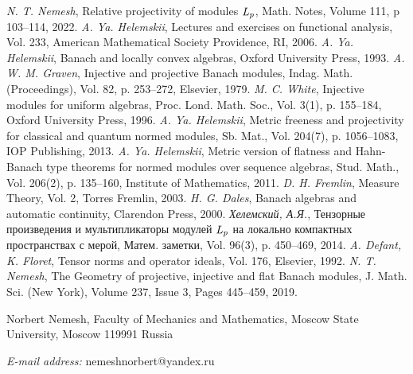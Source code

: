 \documentclass[12pt]{article}
\begin{document}
\begin{thebibliography}{999}
    \textit{N. T. Nemesh}, Relative projectivity of 
    modules $\it{L_p}$, Math. Notes, Volume 111, p 103--114, 2022.
    \textit{A. Ya. Helemskii}, Lectures and 
    exercises on functional analysis, Vol. 233, 
    American Mathematical Society Providence, RI, 2006.
    \textit{A. Ya. Helemskii}, Banach and locally 
    convex algebras, Oxford University Press, 1993.
    \textit{A. W. M. Graven}, Injective and 
    projective Banach modules, Indag. Math. (Proceedings), Vol. 82, p. 253--272,
    Elsevier, 1979.
    \textit{M. C. White}, Injective modules for uniform 
    algebras, Proc. Lond. Math. Soc., Vol. 3(1), p. 155--184, Oxford University 
    Press, 1996.
    \textit{A. Ya. Helemskii}, Metric freeness and 
    projectivity for classical and quantum normed modules, Sb. Mat., 
    Vol. 204(7), p. 1056--1083, IOP Publishing, 2013.
    \textit{A. Ya. Helemskii}, Metric version of 
    flatness and Hahn-Banach type theorems for normed modules over sequence 
    algebras, Stud. Math., Vol. 206(2), p. 135--160, Institute of Mathematics, 
    2011.
    \textit{D. H. Fremlin}, Measure Theory, Vol. 2,
    Torres Fremlin, 2003.
    \textit{H. G. Dales}, Banach algebras and 
    automatic continuity, Clarendon Press, 2000.
    \textit{Хелемский, А.Я.}, Тензорные 
    произведения и мультипликаторы модулей $\it{L_p}$ на локально компактных 
    пространствах с мерой, Матем. заметки, Vol. 96(3), p. 450--469, 2014.
    \textit{A. Defant, K. Floret}, Tensor norms and 
    operator ideals, Vol. 176, Elsevier, 1992.
    \textit{N. T. Nemesh}, The Geometry of 
    projective, injective and flat Banach modules, J. Math. Sci. (New York), 
    Volume 237, Issue 3, Pages 445–459, 2019.
\end{thebibliography}

Norbert Nemesh, Faculty of Mechanics and Mathematics, Moscow State University,
Moscow 119991 Russia

\textit{E-mail address:} nemeshnorbert@yandex.ru
\end{document}
